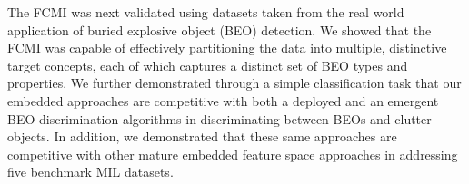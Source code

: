 \documentclass[12pt,dvips]{report}
\numberwithin{equation}{section}
\begin{document}
The FCMI was next validated using datasets taken from the real world application of buried explosive object (BEO) detection.  We showed that the FCMI was capable of effectively partitioning the data into multiple, distinctive target concepts, each of which captures a distinct set of BEO types and properties.  We further demonstrated through a simple classification task that our embedded approaches are competitive with both a deployed and an emergent BEO discrimination algorithms in discriminating between BEOs and clutter objects.  In addition, we demonstrated that these same approaches are competitive with other mature embedded feature space approaches in addressing five benchmark MIL datasets.



\clearpage
{}


\pagebreak
\markright{ \hfill \hfill}
\singlespacing
\end{document}
